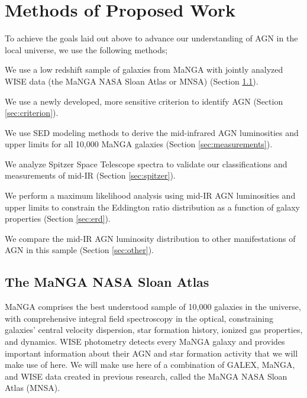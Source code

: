 \documentclass[12pt, preprint]{hacked-aastex}
\newlength{\mylen}
\newenvironment{ditemize}
{ \begin{list}{}{%
\setlength{\topsep}{0pt}%
\setlength{\partopsep}{3pt}%
\setlength{\itemsep}{1pt}\setlength{\parsep}{1pt}%
\setlength{\itemindent}{0pt}\setlength{\listparindent}{12pt}%
\setlength{\leftmargin}{24pt}\setlength{\rightmargin}{0in}%
\setlength{\labelsep}{3pt}\setlength{\labelwidth}{6pt}%
\setlength{\mylen}{3pt}
\renewcommand{\makelabel}{\makebox[\labelwidth][l]{\raisebox{\mylen}{\tiny$\bullet$}\hspace{\fill}}}}}
{\end{list}}
\begin{document}
\section{Methods of Proposed Work\label{sec:methods}}

To achieve the goals laid out above to advance our understanding 
of AGN in the local universe, we use the following methods;
\begin{ditemize}
    \item We use a low redshift sample of galaxies from MaNGA with 
    jointly analyzed WISE data (the MaNGA NASA Sloan Atlas or MNSA)
    (Section \ref{sec:mnsa}).
    \item We use a newly developed, more sensitive criterion to 
    identify AGN  (Section \ref{sec:criterion}).
    \item We use SED modeling methods to derive the mid-infrared AGN 
    luminosities and upper limits for all 10,000 MaNGA galaxies
    (Section \ref{sec:measurements}). 
    \item We analyze Spitzer Space Telescope spectra to validate our 
    classifications and measurements of mid-IR (Section
    \ref{sec:spitzer}).
    \item We perform a maximum likelihood analysis using mid-IR AGN luminosities 
     and upper limits to constrain the Eddington ratio  distribution as a 
     function of galaxy properties (Section \ref{sec:erd}).
    \item We compare the mid-IR AGN luminosity distribution to other manifestations 
    of AGN in this sample (Section \ref{sec:other}).
\end{ditemize}

\subsection{The MaNGA NASA Sloan Atlas}
\label{sec:mnsa}

MaNGA comprises the best understood sample of 10,000 galaxies in the
universe, with comprehensive integral field spectroscopy in the
optical, constraining galaxies' central velocity dispersion, star
formation history, ionized gas properties, and dynamics. WISE
photometry detects every MaNGA galaxy and provides important
information about their AGN and star formation activity that we will
make use of here. We will make use here of a combination of GALEX,
MaNGA, and WISE data created in previous research, called the MaNGA
NASA Sloan Atlas (MNSA).
\end{document}
